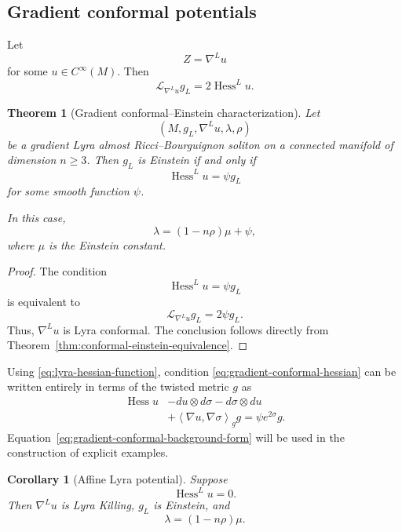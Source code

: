 \documentclass[a4paper,11pt]{article}
\theoremstyle{plain}
\newtheorem{theorem}{Theorem}[section]
\newtheorem{corollary} {Corollary}[section]
\numberwithin{equation}{section}
\begin{document}
\subsection{Gradient conformal potentials}
\label{subsec:gradient-conformal-potentials}

Let
\[
Z=\nabla^{L}u
\]
for some \(u\in C^{\infty}(M)\). Then
\[
\mathcal L_{\nabla^{L}u}g_{L}
=
2\operatorname{Hess}^{L}u.
\]

\begin{theorem}[Gradient conformal--Einstein characterization]
	\label{thm:gradient-conformal-einstein}
	Let
	\[
	\left(
	M,g_{L},\nabla^{L}u,\lambda,\rho
	\right)
	\]
	be a gradient Lyra almost Ricci--Bourguignon soliton on a
	connected manifold of dimension \(n\geq3\). Then \(g_{L}\) is
	Einstein if and only if
	\begin{equation}
		\operatorname{Hess}^{L}u
		=
		\psi g_{L}
		\label{eq:gradient-conformal-hessian}
	\end{equation}
	for some smooth function \(\psi\).
	
	In this case,
	\begin{equation}
		\lambda
		=
		(1-n\rho)\mu+\psi,
		\label{eq:gradient-conformal-relation}
	\end{equation}
	where \(\mu\) is the Einstein constant.
\end{theorem}

\begin{proof}
	The condition
	\[
	\operatorname{Hess}^{L}u=\psi g_{L}
	\]
	is equivalent to
	\[
	\mathcal L_{\nabla^{L}u}g_{L}
	=
	2\psi g_{L}.
	\]
	Thus, \(\nabla^{L}u\) is Lyra conformal. The conclusion follows
	directly from
	Theorem~\ref{thm:conformal-einstein-equivalence}.
\end{proof}

Using \eqref{eq:lyra-hessian-function}, condition
\eqref{eq:gradient-conformal-hessian} can be written entirely in
terms of the twisted metric \(g\) as
\begin{align}
	\operatorname{Hess}u
	&-
	du\otimes d\sigma
	-
	d\sigma\otimes du
	\nonumber\\
	&+
	\left\langle
	\nabla u,\nabla\sigma
	\right\rangle_{g}g
	=
	\psi e^{2\sigma}g.
	\label{eq:gradient-conformal-background-form}
\end{align}
Equation~\eqref{eq:gradient-conformal-background-form} will be
used in the construction of explicit examples.

\begin{corollary}[Affine Lyra potential]
	\label{cor:affine-lyra-potential}
	Suppose
	\[
	\operatorname{Hess}^{L}u=0.
	\]
	Then \(\nabla^{L}u\) is Lyra Killing, \(g_{L}\) is Einstein, and
	\begin{equation}
		\lambda
		=
		(1-n\rho)\mu.
		\label{eq:affine-gradient-relation}
	\end{equation}
\end{corollary}
\end{document}
